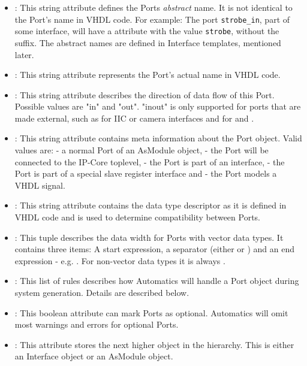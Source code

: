 \begin{itemize}
\item {}: This string attribute defines the Ports \emph{abstract} name. It is not identical to the Port's name in VHDL code. For example: The port \texttt{strobe\_in}, part of some interface, will have a  attribute with the value \texttt{strobe}, without the suffix. The abstract names are defined in Interface templates, mentioned later.
\item {}: This string attribute represents the Port's actual name in VHDL code.
\item {}: This string attribute describes the direction of data flow of this Port. Possible values are "in" and "out". "inout" is only supported for ports that are made external, such as for IIC or camera interfaces and for  and .
\item {}: This string attribute contains meta information about the Port object. Valid values are:  - a normal Port of an AsModule object,  - the Port will be connected to the IP-Core toplevel,  - the Port is part of an interface,  - the Port is part of a special slave register interface and  - the Port models a VHDL signal.
\item {}: This string attribute contains the data type descriptor as it is defined in VHDL code and is used to determine compatibility between Ports.
\item {}: This tuple describes the data width for Ports with vector data types. It contains three items: A start expression, a separator (either  or ) and an end expression - e.g. . For non-vector data types it is always .
\item {}: This list of rules describes how Automatics will handle a Port object during system generation. Details are described below.
\item {}: This boolean attribute can mark Ports as optional. Automatics will omit most warnings and errors for optional Ports.
\item {}: This attribute stores the next higher object in the hierarchy. This is either an Interface object or an AsModule object.
\end{itemize}

